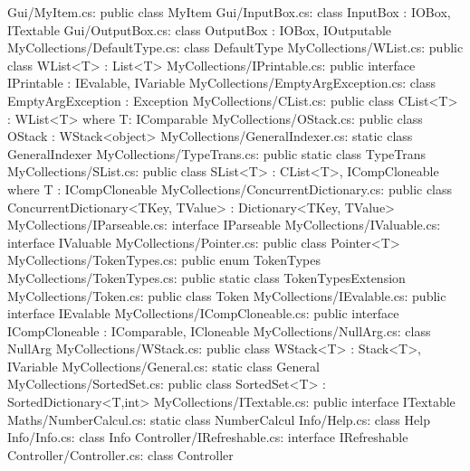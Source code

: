 Gui/MyItem.cs:	public class MyItem 
Gui/InputBox.cs:	class InputBox : IOBox, ITextable 
Gui/OutputBox.cs:	class OutputBox : IOBox, IOutputable 
MyCollections/DefaultType.cs:	class DefaultType 
MyCollections/WList.cs:	public class WList<T> : List<T> 
MyCollections/IPrintable.cs:	public interface IPrintable : IEvalable, IVariable 
MyCollections/EmptyArgException.cs:	class EmptyArgException : Exception 
MyCollections/CList.cs:	public class CList<T> : WList<T> where T: IComparable 
MyCollections/OStack.cs:	public class OStack : WStack<object> 
MyCollections/GeneralIndexer.cs:	static class GeneralIndexer 
MyCollections/TypeTrans.cs:	public static class TypeTrans 
MyCollections/SList.cs:	public class SList<T> : CList<T>, ICompCloneable where T : ICompCloneable 
MyCollections/ConcurrentDictionary.cs:	public class ConcurrentDictionary<TKey, TValue> : Dictionary<TKey, TValue> 
MyCollections/IParseable.cs:	interface IParseable 
MyCollections/IValuable.cs:	interface IValuable 
MyCollections/Pointer.cs:	public class Pointer<T> 
MyCollections/TokenTypes.cs:	public enum TokenTypes 
MyCollections/TokenTypes.cs:	public static class TokenTypesExtension 
MyCollections/Token.cs:	public class Token 
MyCollections/IEvalable.cs:	public interface IEvalable 
MyCollections/ICompCloneable.cs:	public interface ICompCloneable : IComparable, ICloneable 
MyCollections/NullArg.cs:	class NullArg 
MyCollections/WStack.cs:	public class WStack<T> : Stack<T>, IVariable 
MyCollections/General.cs:	static class General 
MyCollections/SortedSet.cs:	public class SortedSet<T> : SortedDictionary<T,int> 
MyCollections/ITextable.cs:	public interface ITextable 
Maths/NumberCalcul.cs:	static class NumberCalcul 
Info/Help.cs:	class Help 
Info/Info.cs:	class Info 
Controller/IRefreshable.cs:	interface IRefreshable 
Controller/Controller.cs:    class Controller 
